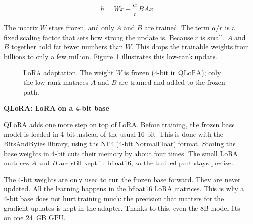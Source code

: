 \documentclass[a4paper,12pt]{report}
\newcommand{\minisection}[1]{%
  \vspace{1ex}
  \noindent\textbf{#1}\par
  \vspace{0.5ex}
}
\begin{document}
\begin{equation}
h = Wx + \frac{\alpha}{r}\, BAx
\label{eq:lora}
\end{equation}

The matrix $W$ stays frozen, and only $A$ and $B$ are trained. The term $\alpha/r$ is a fixed scaling factor that sets how strong the update is. Because $r$ is small, $A$ and $B$ together hold far fewer numbers than $W$. This drops the trainable weights from billions to only a few million. Figure~\ref{fig:qlora-arch} illustrates this low-rank update.

\begin{figure}[H]
    \centering
    \caption{LoRA adaptation. The weight $W$ is frozen (4-bit in QLoRA); only the low-rank matrices $A$ and $B$ are trained and added to the frozen path.}
    \label{fig:qlora-arch}
\end{figure}

\minisection{QLoRA: LoRA on a 4-bit base}

QLoRA adds one more step on top of LoRA. Before training, the frozen base model is loaded in 4-bit instead of the usual 16-bit. This is done with the BitsAndBytes library, using the NF4 (4-bit NormalFloat) format. Storing the base weights in 4-bit cuts their memory by about four times. The small LoRA matrices $A$ and $B$ are still kept in bfloat16, so the trained part stays precise.

The 4-bit weights are only used to run the frozen base forward. They are never updated. All the learning happens in the bfloat16 LoRA matrices. This is why a 4-bit base does not hurt training much: the precision that matters for the gradient updates is kept in the adapter. Thanks to this, even the 8B model fits on one 24~GB GPU.
\end{document}
